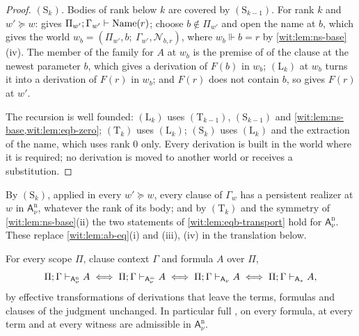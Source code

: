\begin{proof}
\emph{$(\mathrm S_k)$.}  Bodies of rank below $k$ are covered by
$(\mathrm S_{k-1})$.  For rank $k$ and $w'\succeq w$:  gives
$\Pi_{w'};\Gamma_{w'}\vdash\mathrm{Name}(r)$; choose $b\notin\Pi_{w'}$ and
open the name at $b$, which gives the world
$w_b=(\Pi_{w'},b;\ \Gamma_{w'},\mathcal N_{b,r})$, where $w_b\Vdash b=r$ by
\cref{wit:lem:ns-base}(iv).  The member of the family for $A$ at $w_b$ is
the premise of  of the clause at the newest parameter $b$, which
gives a derivation of $F(b)$ in $w_b$; $(\mathrm L_k)$ at $w_b$ turns it into
a derivation of $F(r)$ in $w_b$; and $F(r)$ does not contain $b$, so
 gives $F(r)$ at $w'$.

The recursion is well founded: $(\mathrm L_k)$ uses
$(\mathrm T_{k-1})$, $(\mathrm S_{k-1})$ and
\cref{wit:lem:ns-base,wit:lem:eqb-zero}; $(\mathrm T_k)$ uses
$(\mathrm L_k)$; $(\mathrm S_k)$ uses $(\mathrm L_k)$ and the extraction of
the name, which uses rank $0$ only.  Every derivation is built in the world
where it is required; no derivation is moved to another world or receives a
substitution.
\end{proof}

By $(\mathrm S_k)$, applied in every $w'\succeq w$, every clause of
$\Gamma_w$ has a persistent realizer at $w$ in $\mathsf{A}^{\mathrm n}_{\nu}$,
whatever the rank of its body; and by $(\mathrm T_k)$ and the symmetry of
\cref{wit:lem:ns-base}(ii) the two statements of
\cref{wit:lem:eqb-transport} hold for $\mathsf{A}^{\mathrm n}_{\nu}$.  These
replace \cref{wit:lem:ab-eq}(i) and (iii), (iv) in the translation below.

\begin{theorem}
\label{wit:thm:ns-complete}
For every scope $\Pi$, clause context $\Gamma$ and formula $A$ over $\Pi$,
\[
 \Pi;\Gamma\vdash_{\mathsf{A}^{\mathrm n}_{\nu}}A
 \iff \Pi;\Gamma\vdash_{\mathsf{A}^{=}_{\nu}}A
 \iff \Pi;\Gamma\vdash_{\mathsf{A}_{\nu}}A
 \iff \Pi;\Gamma\vdash_{\mathsf{A}_{\ast}}A ,
\]
by effective transformations of derivations that leave the terms, formulas
and clauses of the judgment unchanged.  In particular full ,
 on every formula,  at every term and
 at every witness are admissible in
$\mathsf{A}^{\mathrm n}_{\nu}$.
\end{theorem}

